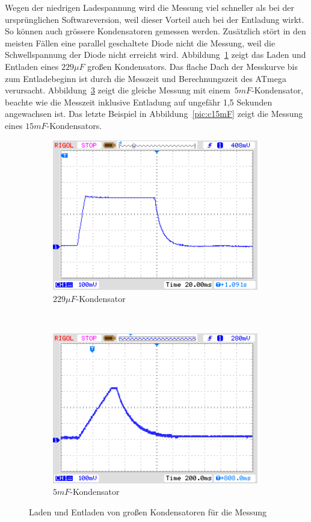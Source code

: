Wegen der niedrigen Ladespannung wird die Messung viel schneller als bei der ursprünglichen Softwareversion,
weil dieser Vorteil auch bei der Entladung wirkt. So können auch grössere Kondensatoren gemessen werden.
Zusätzlich stört in den meisten Fällen eine parallel geschaltete Diode nicht die Messung, weil die Schwellspannung
der Diode nicht erreicht wird.
Abbildung~\ref{pic:c229} zeigt das Laden und Entladen eines \(229\mu F\) großen Kondensators.
Das flache Dach der Messkurve bis zum Entladebeginn ist durch die Messzeit und Berechnungszeit des ATmega verursacht.
Abbildung~\ref{pic:c5mF} zeigt die gleiche Messung mit einem~\(5mF\)-Kondensator,
beachte wie die Messzeit inklusive Entladung auf ungefähr 1,5 Sekunden angewachsen ist.
Das letzte Beispiel in Abbildung~\ref{pic:c15mF} zeigt die Messung eines \(15mF\)-Kondensators.

\begin{figure}[H]
  \begin{subfigure}[b]{9cm}
    \centering
    \includegraphics[width=9cm]{../PNG/charge_229uF.png}
    \caption{\(229\mu F\)-Kondensator}
    \label{pic:c229}
  \end{subfigure}
  ~
  \begin{subfigure}[b]{9cm}
    \centering
    \includegraphics[width=9cm]{../PNG/charge_5mF.png}
    \caption{\(5mF\)-Kondensator}
    \label{pic:c5mF}
  \end{subfigure}
  \caption{Laden und Entladen von großen Kondensatoren für die Messung}
\end{figure}

